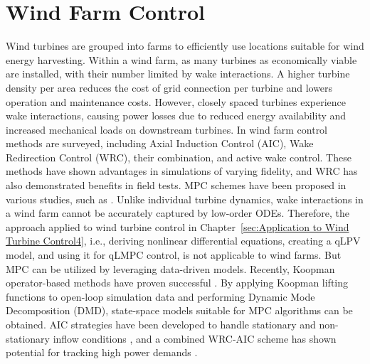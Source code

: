 \chapter{Wind Farm Control} \label{sec:ApplicationtoWindFarmControl}

Wind turbines are grouped into farms to efficiently use locations suitable for wind energy harvesting. Within a wind farm, as many turbines as economically viable are installed, with their number limited by wake interactions. A higher turbine density per area reduces the cost of grid connection per turbine and lowers operation and maintenance costs. However, closely spaced turbines experience wake interactions, causing power losses due to reduced energy availability and increased mechanical loads on downstream turbines.
In \cite{houck2022review} wind farm control methods are surveyed, including Axial Induction Control (AIC), Wake Redirection Control (WRC), their combination, and active wake control. These methods have shown advantages in simulations of varying fidelity, and WRC has also demonstrated benefits in field tests. MPC schemes have been proposed in various studies, such as \cite{spudic2014distMPC_https://doi.org/10.1002/oca.2136, zhao2016coordinated, bay2018active, vali2019adjoint}. Unlike individual turbine dynamics, wake interactions in a wind farm cannot be accurately captured by low-order ODEs. Therefore, the approach applied to wind turbine control in Chapter~\ref{sec:Application to Wind Turbine Control4}, i.e., deriving nonlinear differential equations, creating a qLPV model, and using it for qLMPC control, is not applicable to wind farms. But MPC can be utilized by leveraging data-driven models. Recently, Koopman operator-based methods have proven successful \cite{castillo2020wind, cassamo2021model}. By applying Koopman lifting functions to open-loop simulation data and performing Dynamic Mode Decomposition (DMD), state-space models suitable for MPC algorithms can be obtained. AIC strategies have been developed to handle stationary \cite{sharan2022Koopman} and non-stationary inflow conditions \cite{dittmer2022data}, and a combined WRC-AIC scheme has shown potential for tracking high power demands \cite{dittmer2023koopman}.
%
